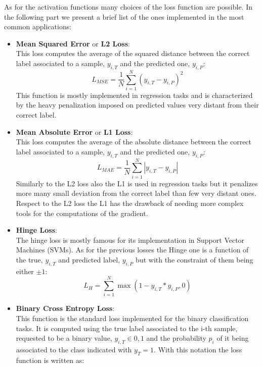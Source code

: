 As for the activation functions many choices of the loss function are possible. In the following part we present a brief list of the ones implemented in the most common applications:
\begin{itemize}
    \item \textbf{Mean Squared Error} or \textbf{L2 Loss}:\\
    This loss computes the average of the squared distance between the correct label associated to a sample, $y_{i,T}$ and the predicted one, $y_{i,P}$:
    \begin{equation}
        L_{MSE}= \frac{1}{N}\sum_{i=1}^N \left(y_{i,T}-y_{i,P}\right)^2
    \end{equation}
    This function is mostly implemented in regression tasks and is characterized by the heavy penalization imposed on predicted values very distant from their correct label.
    \item \textbf{Mean Absolute Error} or \textbf{L1 Loss}:\\
    This loss computes the average of the absolute distance between the correct label associated to a sample, $y_{i,T}$ and the predicted one, $y_{i,P}$:
    \begin{equation}
        L_{MAE}= \frac{1}{N}\sum_{i=1}^N \left|y_{i,T}-y_{i,P}\right|
    \end{equation}
    Similarly to the L2 loss also the L1 is used in regression tasks but it penalizes more many small deviation from the correct label than few very distant ones. Respect to the L2 loss the L1 has the drawback of needing more complex tools for the computations of the gradient. 
\item \textbf{Hinge Loss}:\\
    The hinge loss is mostly famous for its implementation in Support Vector Machines (SVMs). As for the previous losses the Hinge one is a function of the true, $y_{i,T}$ and  predicted label, $y_{i,P}$ but with the constraint of them being either $\pm 1$:
    \begin{equation}
        L_{H}= \sum_{i=1}^N \max\left( 1-y_{i,T}*y_{i,P},0\right)
    \end{equation}
\item \textbf{Binary Cross Entropy Loss}:\\
    This function is the standard loss implemented for the binary classification tasks. It is computed using the true label associated to the i-th sample, requested to be a binary value, $y_{i,T}\in{0,1}$ and the probability $p_{i}$ of it being associated to the class indicated with $y_{T}=1$. With this notation the loss function is written as:

\end{itemize}

